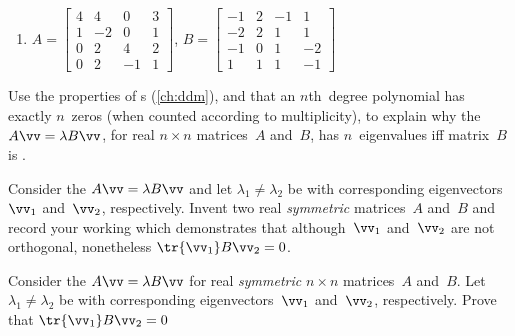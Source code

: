 \begin{exercise}
\begin{enumerate}
\item \(A=\begin{bmatrix} 4 & 4 & 0 & 3
\\ 1 & -2 & 0 & 1
\\ 0 & 2 & 4 & 2
\\ 0 & 2 & -1 & 1 \end{bmatrix}\),
\(B=\begin{bmatrix} -1 & 2 & -1 & 1
\\ -2 & 2 & 1 & 1
\\ -1 & 0 & 1 & -2
\\ 1 & 1 & 1 & -1 \end{bmatrix}\)
  
\end{enumerate}
\end{exercise}


\begin{exercise}  
Use the properties of s (\cref{ch:ddm}), and that an \(n\)th~degree polynomial has exactly \(n\)~zeros (when counted according to multiplicity), to explain why the  \(A\vv=\lambda B\vv\), for real \(n\times n\) matrices~\(A\) and~\(B\), has \(n\)~eigenvalues iff matrix~\(B\) is .
\end{exercise}


\begin{exercise}  
Consider the  \(A\vv=\lambda B\vv\) and let \(\lambda_1\neq\lambda_2\) be  with corresponding eigenvectors~\(\vv_1\) and~\(\vv_2\), respectively.
Invent two real \emph{symmetric} matrices~\(A\) and~\(B\) and record your working which demonstrates that although~\(\vv_1\) and~\(\vv_2\) are not orthogonal, nonetheless \(\tr{\vv_1}B\vv_2=0\).
\end{exercise}


\begin{exercise} \label{ex:eennmov} 
Consider the  \(A\vv=\lambda B\vv\) for real \emph{symmetric} \(n\times n\) matrices~\(A\) and~\(B\). 
Let \(\lambda_1\neq\lambda_2\) be  with corresponding eigenvectors~\(\vv_1\) and~\(\vv_2\), respectively.
Prove that \(\tr{\vv_1}B\vv_2=0\) 
\end{exercise}


